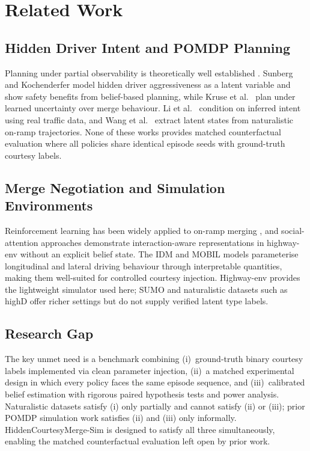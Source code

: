 \section{Related Work}
\label{sec:related}

\subsection{Hidden Driver Intent and POMDP Planning}
Planning under partial observability is theoretically well established
\citep{kaelbling1998planning,kochenderfer2022algorithms}.
Sunberg and Kochenderfer \citep{sunberg2020internalstates} model hidden
driver aggressiveness as a latent variable and show safety benefits from
belief-based planning, while Kruse et al.\ \citep{kruse2022uncertainty}
plan under learned uncertainty over merge behaviour.
Li et al.\ \citep{li2021interactionaware} condition on inferred intent using
real traffic data, and Wang et al.\ \citep{wang2021uncovering} extract latent
states from naturalistic on-ramp trajectories.
None of these works provides matched counterfactual evaluation where all
policies share identical episode seeds with ground-truth courtesy labels.

\subsection{Merge Negotiation and Simulation Environments}
Reinforcement learning has been widely applied to on-ramp merging
\citep{chen2021deep,liu2022autonomous}, and social-attention approaches
\citep{leurent2019social} demonstrate interaction-aware representations in
highway-env without an explicit belief state.
The IDM \citep{treiber2000congested} and MOBIL \citep{kesting2007mobil}
models parameterise longitudinal and lateral driving behaviour through
interpretable quantities, making them well-suited for controlled courtesy
injection.
Highway-env \citep{leurent_highway_env} provides the lightweight simulator
used here; SUMO \citep{lopez2018microscopic} and naturalistic datasets such
as highD \citep{krajewski2018highd} offer richer settings but do not supply
verified latent type labels.

\subsection{Research Gap}
The key unmet need is a benchmark combining (i)~ground-truth binary courtesy
labels implemented via clean parameter injection, (ii)~a matched experimental
design in which every policy faces the same episode sequence, and
(iii)~calibrated belief estimation with rigorous paired hypothesis tests and
power analysis.
Naturalistic datasets satisfy (i) only partially and cannot satisfy (ii) or
(iii); prior POMDP simulation work satisfies (ii) and (iii) only informally.
HiddenCourtesyMerge-Sim is designed to satisfy all three simultaneously,
enabling the matched counterfactual evaluation left open by prior work.
